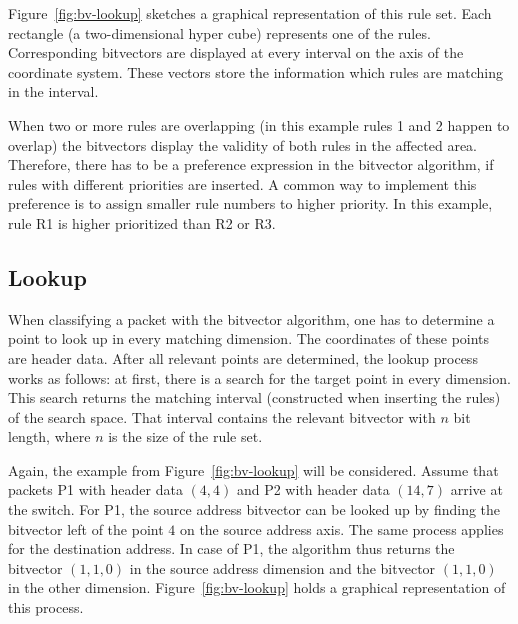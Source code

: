\documentclass[conference]{IEEEtran}
\begin{document}
Figure~\ref{fig:bv-lookup} sketches a graphical representation of this rule set.
Each rectangle (a two-dimensional hyper cube) represents one of the rules.
Corresponding bitvectors are displayed at every interval on the axis of the coordinate system.
These vectors store the information which rules are matching in the interval.

When two or more rules are overlapping (in this example rules 1 and 2 happen 
to overlap) the bitvectors display the validity of both rules in the affected area.
Therefore, there has to be a preference expression in the bitvector algorithm, 
if rules with different priorities are inserted.
A common way to implement this preference is to assign smaller rule numbers to higher priority.
In this example, rule R1 is higher prioritized than R2 or R3.

\subsection{Lookup}
When classifying a packet with the bitvector algorithm, one has to determine a point to look up in every matching dimension.
The coordinates of these points are header data.
After all relevant points are determined, the lookup process works as follows:
at first, there is a search for the target point in every dimension.
This search returns the matching interval (constructed when inserting the rules) of the search space.
That interval contains the relevant bitvector with $n$ bit length, where $n$ is the size of the rule set.

Again, the example from Figure~\ref{fig:bv-lookup} will be considered.
Assume that packets P1 with header data $(4, 4)$ and P2 with header data $(14, 7)$ arrive at the switch.
For P1, the source address bitvector can be looked up by finding the
bitvector left of the point $4$ on the source address axis.
The same process applies for the destination address.
In case of P1, the algorithm thus returns the bitvector $(1, 1, 0)$ in the 
source address dimension and the bitvector $(1, 1, 0)$ in the other dimension.
Figure~\ref{fig:bv-lookup} holds a graphical representation of this process.
\end{document}
